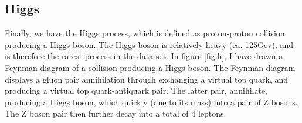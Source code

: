 \subsection{Higgs}
Finally, we have the Higgs process, which is defined as proton-proton collision producing a Higgs boson. The Higgs boson is relatively heavy (ca. 125Gev), and is therefore
the rarest process in the data set. In figure \ref{fig:h}, I have drawn a Feynman diagram of a collision producing a Higgs boson. The Feynman diagram displays a gluon pair annihilation
through exchanging a virtual top quark, and producing a virtual top quark-antiquark pair. The latter pair, annihilate, producing a Higgs boson, which quickly (due to its mass) into a 
pair of Z bosons. The Z boson pair then further decay into a total of 4 leptons. 

\begin{figure}
\end{figure}
